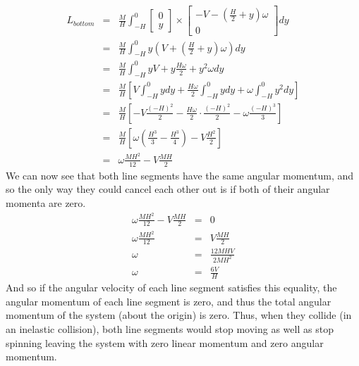 \documentclass[12pt]{article}
\begin{document}
\begin{eqnarray*}
L_{bottom}
    &=& \frac{M}{H} \int_{-H}^{0}
        \begin{bmatrix}
            0 \\
            y
        \end{bmatrix} \times
        \begin{bmatrix}
            - V - \left( \frac{H}{2} + y \right) \omega \\
            0
        \end{bmatrix} dy \\
    &=& \frac{M}{H} \int_{-H}^{0}
        y \left( V + \left( \frac{H}{2} + y \right) \omega \right) dy \\
    &=& \frac{M}{H} \int_{-H}^{0} y V + y\frac{H \omega}{2} + y^2 \omega dy \\
    &=& \frac{M}{H}
        \left[
            V \int_{-H}^{0} y dy
            + \frac{H \omega}{2} \int_{-H}^{0} y dy
            + \omega \int_{-H}^{0} y^2 dy
        \right] \\
    &=& \frac{M}{H}
        \left[
            - V \frac{\left( - H \right)^2}{2}
            - \frac{H \omega}{2} \cdot \frac{ \left( - H \right)^2}{2}
            - \omega \frac{ \left( - H \right)^3}{3}
        \right] \\
    &=& \frac{M}{H}
        \left[
            \omega \left( \frac{H^3}{3} - \frac{H^3}{4} \right) - V \frac{H^2}{2}
        \right] \\
    &=& \omega \frac{M H^2}{12} - V \frac{M H}{2}
\end{eqnarray*}
We can now see that both line segments have the same angular momentum, and so the only way
they could cancel each other out is if both of their angular momenta are zero.
\begin{eqnarray*}
    \omega \frac{M H^2}{12} - V \frac{M H}{2} &=& 0 \\
    \omega \frac{M H^2}{12} &=& V \frac{M H}{2} \\
    \omega &=& \frac{12 M H V}{2 M H^2} \\
    \omega &=& \frac{6 V}{H}
\end{eqnarray*}
And so if the angular velocity of each line segment satisfies this equality, the angular momentum
of each line segment is zero, and thus the total angular momentum of the system (about the origin)
is zero.  Thus, when they collide (in an inelastic collision), both line segments would stop
moving as well as stop spinning leaving the system with zero linear momentum and zero angular
momentum.
\end{document}
